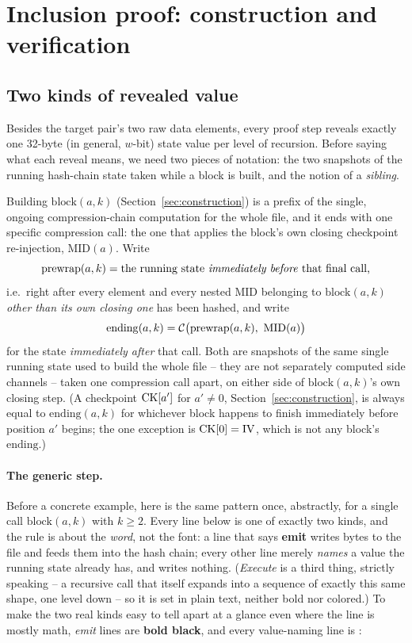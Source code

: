 \section{Inclusion proof: construction and verification}
\label{sec:algorithm}

\subsection{Two kinds of revealed value}

Besides the target pair's two raw data elements, every proof step reveals
exactly one 32-byte (in general, $w$-bit) state value per level of
recursion. Before saying what each reveal means, we need two pieces of
notation: the two snapshots of the running hash-chain state taken while a
block is built, and the notion of a \emph{sibling}.

\begin{definition}
\label{def:prewrap-ending}
Building $\mathrm{block}(a,k)$ (Section~\ref{sec:construction}) is a
prefix of the single, ongoing compression-chain computation for the whole
file, and it ends with one specific compression call: the one that applies
the block's own closing checkpoint re-injection, $\mathrm{MID}(a)$. Write
\[
\mathrm{prewrap}(a,k) = \text{the running state \emph{immediately before}
that final call,}
\]
i.e.\ right after every element and every nested $\mathrm{MID}$ belonging to
$\mathrm{block}(a,k)$ \emph{other than its own closing one} has been hashed,
and write
\[
\mathrm{ending}(a,k) = \mathcal{C}\big(\mathrm{prewrap}(a,k),\ \mathrm{MID}(a)\big)
\]
for the state \emph{immediately after} that call. Both are snapshots of the
same single running state used to build the whole file -- they are not
separately computed side channels -- taken one compression call apart, on
either side of $\mathrm{block}(a,k)$'s own closing step. (A checkpoint
$\mathrm{CK}[a']$ for $a' \ne 0$, Section~\ref{sec:construction}, is always equal
to $\mathrm{ending}(a,k)$ for whichever block happens to finish immediately
before position $a'$ begins; the one exception is $\mathrm{CK}[0] = \mathrm{IV}$,
which is not any block's $\mathrm{ending}$.)
\end{definition}

\paragraph{The generic step.} Before a concrete example, here is the same
pattern once, abstractly, for a single call $\mathrm{block}(a,k)$ with
$k \ge 2$. Every line below is one of exactly two kinds, and the rule is
about the \emph{word}, not the font: a line that says \textbf{emit} writes
bytes to the file and feeds them into the hash chain; every other line
merely \emph{names} a value the running state already has, and writes
nothing. (\emph{Execute} is a third thing, strictly speaking -- a recursive
call that itself expands into a sequence of exactly this same shape, one
level down -- so it is set in plain text, neither bold nor colored.) To
make the two real kinds easy to tell apart at a glance even where the
line is mostly math, \emph{emit} lines are \textbf{bold black}, and every
value-naming line is :

